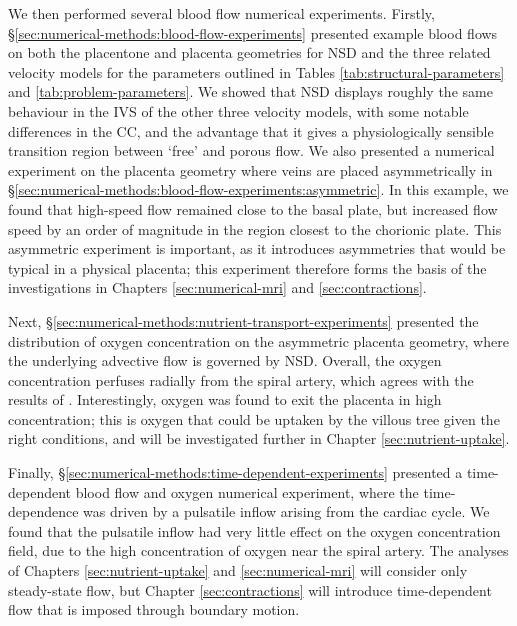         We then performed several blood flow numerical experiments. Firstly, \S\ref{sec:numerical-methods:blood-flow-experiments} presented example blood flows on both the placentone and placenta geometries for NSD and the three related velocity models for the parameters outlined in Tables \ref{tab:structural-parameters} and \ref{tab:problem-parameters}. We showed that NSD displays roughly the same behaviour in the IVS of the other three velocity models, with some notable differences in the CC, and the advantage that it gives a physiologically sensible transition region between `free' and porous flow. We also presented a numerical experiment on the placenta geometry where veins are placed asymmetrically in \S\ref{sec:numerical-methods:blood-flow-experiments:asymmetric}. In this example, we found that high-speed flow remained close to the basal plate, but increased flow speed by an order of magnitude in the region closest to the chorionic plate. This asymmetric experiment is important, as it introduces asymmetries that would be typical in a physical placenta; this experiment therefore forms the basis of the investigations in Chapters \ref{sec:numerical-mri} and \ref{sec:contractions}.
        
        Next, \S\ref{sec:numerical-methods:nutrient-transport-experiments} presented the distribution of oxygen concentration on the asymmetric placenta geometry, where the underlying advective flow is governed by NSD. Overall, the oxygen concentration perfuses radially from the spiral artery, which agrees with the results of \citeauthor{chernyavskyMathematicalModelIntervillous2010} \cite{chernyavskyMathematicalModelIntervillous2010}. Interestingly, oxygen was found to exit the placenta in high concentration; this is oxygen that could be uptaken by the villous tree given the right conditions, and will be investigated further in Chapter \ref{sec:nutrient-uptake}.
        
        Finally, \S\ref{sec:numerical-methods:time-dependent-experiments} presented a time-dependent blood flow and oxygen numerical experiment, where the time-dependence was driven by a pulsatile inflow arising from the cardiac cycle. We found that the pulsatile inflow had very little effect on the oxygen concentration field, due to the high concentration of oxygen near the spiral artery. The analyses of Chapters \ref{sec:nutrient-uptake} and \ref{sec:numerical-mri} will consider only steady-state flow, but Chapter \ref{sec:contractions} will introduce time-dependent flow that is imposed through boundary motion.

